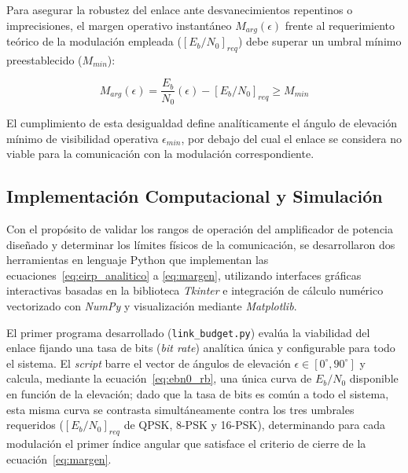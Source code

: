 Para asegurar la robustez del enlace ante desvanecimientos repentinos o imprecisiones, el margen operativo instantáneo $M_{arg}(\epsilon)$ frente al requerimiento teórico de la modulación empleada ($[E_b/N_0]_{req}$) debe superar un umbral mínimo preestablecido ($M_{min}$):

\begin{equation}
    M_{arg}(\epsilon) = \frac{E_b}{N_0}(\epsilon) - [E_b/N_0]_{req} \ge M_{min}
    \label{eq:margen}
\end{equation}

El cumplimiento de esta desigualdad define analíticamente el ángulo de elevación mínimo de visibilidad operativa $\epsilon_{min}$, por debajo del cual el enlace se considera no viable para la comunicación con la modulación correspondiente.

\subsection{Implementación Computacional y Simulación}
Con el propósito de validar los rangos de operación del amplificador de potencia diseñado y determinar los límites físicos de la comunicación, se desarrollaron dos herramientas en lenguaje Python que implementan las ecuaciones~\eqref{eq:eirp_analitico} a \eqref{eq:margen}, utilizando interfaces gráficas interactivas basadas en la biblioteca \textit{Tkinter} e integración de cálculo numérico vectorizado con \textit{NumPy} y visualización mediante \textit{Matplotlib}.

El primer programa desarrollado (\texttt{link\_budget.py}) evalúa la viabilidad del enlace fijando una tasa de bits (\textit{bit rate}) analítica única y configurable para todo el sistema. El \textit{script} barre el vector de ángulos de elevación $\epsilon \in [0^\circ, 90^\circ]$ y calcula, mediante la ecuación~\eqref{eq:ebn0_rb}, una única curva de $E_b/N_0$ disponible en función de la elevación; dado que la tasa de bits es común a todo el sistema, esta misma curva se contrasta simultáneamente contra los tres umbrales requeridos ($[E_b/N_0]_{req}$ de QPSK, 8-PSK y 16-PSK), determinando para cada modulación el primer índice angular que satisface el criterio de cierre de la ecuación~\eqref{eq:margen}.

